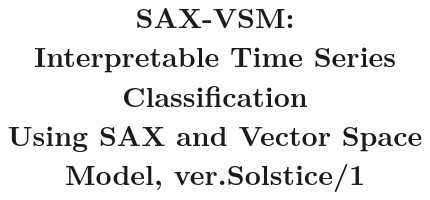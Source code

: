 \documentclass[conference]{IEEEtran}
\begin{document}
%
\title{SAX-VSM: \\Interpretable Time Series Classification\\ Using SAX and Vector Space Model,
ver.Solstice/1}




% 




\end{document}
